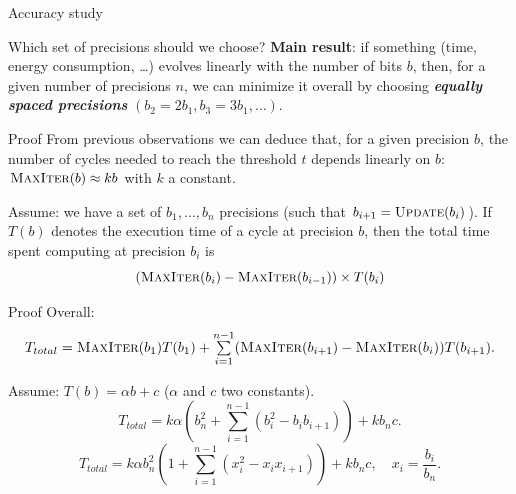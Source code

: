 \documentclass{beamer}
\begin{document}
\begin{frame}{Accuracy study}
\end{frame}

\begin{frame}{Which set of precisions should we choose?}
  \textbf{Main result}: if something (time, energy consumption, \dots) evolves linearly with the number of bits $b$, then, for a given number of precisions $n$, we can minimize it overall by choosing \textbf{\textit{equally spaced precisions}} $(b_2 = 2b_1, b_3 = 3b_1, \dots)$.
\end{frame}

\begin{frame}{Proof}
 From previous observations we can deduce that, for a given precision $b$, the number of cycles needed to reach the threshold $t$ depends linearly on $b$: $\textsc{MaxIter}(b) \approx  kb $ with $k$ a constant.
 \vspace{0.5cm}
 \pause
 
 Assume: we have a set of $b_1,\dots,b_n$ precisions (such that $b_{i+1} = \textsc{Update}(b_i)$). If $T(b)$ denotes the execution time of a cycle at precision $b$, then the total time spent computing at precision $b_i$ is
 \[ (\textsc{MaxIter}(b_{i}) - \textsc{MaxIter}(b_{i-1})) \times T(b_i) \]
\end{frame}

\begin{frame}{Proof}
  Overall:
  \[ \resizebox{\textwidth}{!}{ $ T_{total} = \textsc{MaxIter}(b_1)T(b_1) + \sum\limits_{i=1}^{n-1} (\textsc{MaxIter}(b_{i+1})-\textsc{MaxIter}(b_i))T(b_{i+1}). $ } \]

 Assume: $T(b) = \alpha b+c$ ($\alpha$ and $c$ two constants).
   \begin{equation}
    T_{total}  = k\alpha\left(b_n^2 + \sum\limits_{i=1}^{n-1} (b_i^2 - b_i b_{i+1})\right) + kb_{n}c.
   \end{equation}
   \begin{equation}
    T_{total}  = k\alpha b_n^2\left(1 + \sum\limits_{i=1}^{n-1} (x_i^2 - x_i x_{i+1})\right) + kb_{n}c,\quad x_i = \frac{b_i}{b_n}.
   \end{equation}
\end{frame}
\end{document}
